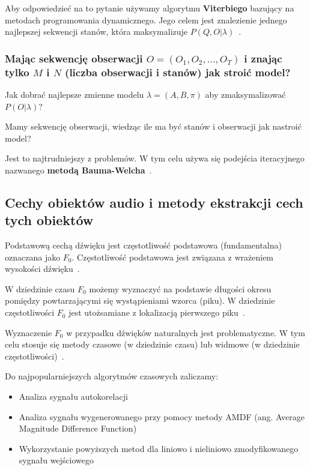 \documentclass[wi]{zut}
\begin{document}
Aby odpowiedzieć na to pytanie używamy algorytmu \textbf{Viterbiego} bazujący na metodach programowania dynamicznego. Jego celem jest znalezienie jednego najlepszej sekwencji stanów, która maksymalizuje $P(Q, O|\lambda)$~\cite{Pietrzykowski2020}.

\subsubsection{Mając sekwencję obserwacji $O = (O_1, O_2, \ldots, O_T)$ i znając tylko $M$ i $N$ (liczba obserwacji i stanów) jak stroić model?}

Jak dobrać najlepsze zmienne modelu $\lambda = (A, B, \pi)$ aby zmaksymalizować $P(O|\lambda)$?

Mamy sekwencję obserwacji, wiedząc ile ma być stanów i obserwacji jak nastroić model?

Jest to najtrudniejszy z problemów. W tym celu używa się podejścia iteracyjnego nazwanego \textbf{metodą Bauma-Welcha}~\cite{Pietrzykowski2020}.

\subsection{Cechy obiektów audio i metody ekstrakcji cech tych obiektów}

Podstawową cechą dźwięku jest częstotliwość podstawowa (fundamentalna) oznaczana jako $F_0$. Częstotliwość podstawowa jest związana z wrażeniem wysokości dźwięku~\cite{Polrolniczak}.

W dziedzinie czasu $F_0$ możemy wyznaczyć na podstawie długości okresu pomiędzy powtarzającymi się wystąpieniami wzorca (piku). W dziedzinie częstotliwości $F_0$ jest utożsamiane z lokalizacją pierwszego piku~\cite{Polrolniczak}.

Wyznaczenie $F_0$ w przypadku dźwięków naturalnych jest problematyczne. W tym celu stosuje się metody czasowe (w dziedzinie czasu) lub widmowe (w dziedzinie częstotliwości)~\cite{Polrolniczak}.

Do najpopularniejszych algorytmów czasowych zaliczamy:

\begin{itemize}
    \item Analiza sygnału autokorelacji
    \item Analiza sygnału wygenerowanego przy pomocy metody AMDF (ang. Average Magnitude Difference Function)
    \item Wykorzystanie powyższych metod dla liniowo i nieliniowo zmodyfikowanego sygnału wejściowego
\end{itemize}
\end{document}
